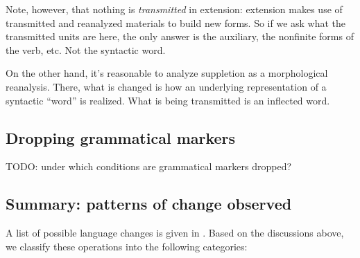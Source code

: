 \documentclass[a4paper, oneside, scheme=plain, 12pt]{article}
\newcommand*{\citechaps}[1]{Chs.~{#1}}
\begin{document}
Note, however, that nothing is \emph{transmitted} in extension:
extension makes use of transmitted and reanalyzed materials to build new forms.
So if we ask what the transmitted units are here,
the only answer is the auxiliary, the nonfinite forms of the verb, etc.
Not the syntactic word.

On the other hand, it's reasonable to analyze suppletion as a morphological reanalysis.
There, what is changed is how an underlying representation of a syntactic ``word'' is realized.
What is being transmitted is an inflected word.

\subsection{Dropping grammatical markers}

TODO: under which conditions are grammatical markers dropped? 

\subsection{Summary: patterns of change observed}\label{sec:all-changes}

A list of possible language changes is given in \citet[\citechaps{10-11}]{campbell2013historical}.
Based on the discussions above, we classify these operations into the following categories:
\end{document}
